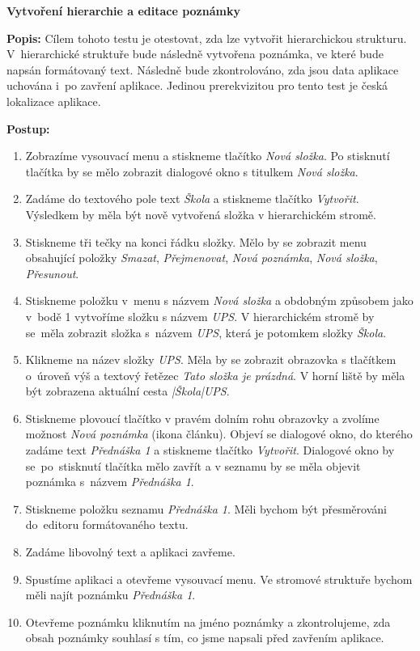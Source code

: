 \documentclass[czech, bc, kiv, he, iso690numb]{fasthesis}
\begin{document}
\noindent \textbf{Vytvoření hierarchie a editace poznámky}

\vspace{0.1cm}

\noindent \textbf{Popis:} Cílem tohoto testu je otestovat, zda lze vytvořit hierarchickou strukturu. V~hierarchické struktuře bude následně vytvořena poznámka, ve které bude napsán formátovaný text. Následně bude zkontrolováno, zda jsou data aplikace uchována i~po zavření aplikace. Jedinou prerekvizitou pro tento test je česká lokalizace aplikace.

\newpage

\noindent \textbf{Postup:}

\begin{enumerate}[label=\arabic*., itemsep=0pt, topsep=0pt, parsep=0pt]
    \item Zobrazíme vysouvací menu a stiskneme tlačítko \textit{Nová složka}. Po stisknutí tlačítka by se mělo zobrazit dialogové okno s titulkem \textit{Nová složka}.
    \item Zadáme do textového pole text \textit{Škola} a stiskneme tlačítko \textit{Vytvořit}. Výsledkem by měla být nově vytvořená složka v hierarchickém stromě.
    \item Stiskneme tři tečky na konci řádku složky. Mělo by se zobrazit menu obsahující položky \textit{Smazat}, \textit{Přejmenovat}, \textit{Nová poznámka}, \textit{Nová složka}, \textit{Přesunout}.
    \item Stiskneme položku v~menu s názvem \textit{Nová složka} a obdobným způsobem jako v~bodě 1 vytvoříme složku s názvem \textit{UPS}. V hierarchickém stromě by se~měla zobrazit složka s~názvem \textit{UPS}, která je potomkem složky \textit{Škola}.
    \item Klikneme na název složky \textit{UPS}. Měla by se zobrazit obrazovka s tlačítkem o~úroveň výš a textový řetězec \textit{Tato složka je prázdná}. V horní liště by měla být zobrazena aktuální cesta \textit{|Škola|UPS}.
    \item Stiskneme plovoucí tlačítko v pravém dolním rohu obrazovky a zvolíme možnost \textit{Nová poznámka} (ikona článku). Objeví se dialogové okno, do kterého zadáme text \textit{Přednáška 1} a stiskneme tlačítko \textit{Vytvořit}. Dialogové okno by se~po~stisknutí tlačítka mělo zavřít a v seznamu by se měla objevit poznámka s~názvem \textit{Přednáška 1}.
    \item Stiskneme položku seznamu \textit{Přednáška 1}. Měli bychom být přesměrováni do~editoru formátovaného textu.
    \item Zadáme libovolný text a aplikaci zavřeme.
    \item Spustíme aplikaci a otevřeme vysouvací menu. Ve stromové struktuře bychom měli najít poznámku \textit{Přednáška 1}.
    \item Otevřeme poznámku kliknutím na jméno poznámky a zkontrolujeme, zda obsah poznámky souhlasí s tím, co jsme napsali před zavřením aplikace.
\end{enumerate}
\end{document}
